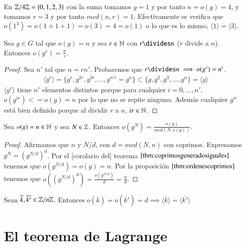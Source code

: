 \begin{ej}
	En $\mathbb{Z}/4\mathbb{Z} = \{0, 1, 2, 3\}$ con la suma tomamos $g = 1$ y por tanto $n = o(g) = 4$, y tomamos $r = 3$ y por tanto $mcd(n, r) = 1$. Efectivamente se verifica que $o(1^3) = o(1+1+1) = o(3) = 4 = o(1)$ o lo que es lo mismo, $\langle 1 \rangle = \langle 3 \rangle$.
\end{ej}

\begin{pro}
	\label{thm:ordenescoprimos}
	Sea $g \in G$ tal que $o(g) = n$ y sea $r \in \mathbb{N}$ con $r \divides n$ ($r$ divide a $n$). Entonces $o(g^r) = \frac{n}{r}$.
\end{pro}

\begin{proof}
	Sea $n'$ tal que $n = rn'$. Probaremos que $r\divides n \implies o(g^r) = n'$.
	\begin{align*}
		\langle g^r \rangle = \{g^r, g^{2r}, g^{3r}, \dots, g^{n'r} = g^n\} \subset \{g, g^2, g^3, \dots, g^n\} = \langle g \rangle
	\end{align*}
	$\langle g^r \rangle$ tiene $n'$ elementos distintos porque para cualquier $i = 0,\dots, n'$, $o(g^{ir}) <= o(g) = n$ por lo que no se repite ninguno. Además cualquier $g^{ir}$ está bien definido porque al dividir $r$ a $n$, $ir \in \mathbb{N}$.
\end{proof}

\begin{thm}
	\label{thm:ordendepotencia}
	Sea $o(g) = n \in \mathbb{N}$ y sea $N \in \mathbb{Z}$. Entonces $o(g^N) = \frac{o(g)}{mcd(N, o(g))}$.
\end{thm}

\begin{proof}
	Afirmamos que $n$ y $N/d$, con $d = mcd(N,n)$ son coprimos. Expresamos $g^N = (g^{N/d})^d$. Por el [corolario del] teorema $\ref{thm:coprimosgeneradosiguales}$ tenemos que $o(g^{N/d}) = o(g) = n$. Por la proposición $\ref{thm:ordenescoprimos}$ tenemos que $o((g^{N/d})^d) = \frac{o(g^{N/d})}{d} = \frac{n}{d}$.
\end{proof}

\begin{thm}
	Sean $\overline{k}, \overline{k'} \in \mathbb{Z}/n\mathbb{Z}$. Entonces $o(\overline{k}) = o(\overline{k'}) = d \implies \langle \overline{k} \rangle = \langle \overline{k'} \rangle$ 
\end{thm}

\section{El teorema de Lagrange}

